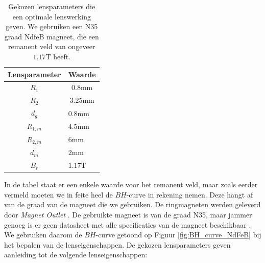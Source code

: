 \documentclass[we,twoside,openright,a4paper,11pt]{uantwerpenbamathesis}
\begin{document}
\begin{table}[H]
\centering
\begin{tabular}{@{}cl@{}}
\toprule
Lensparameter                     & \multicolumn{1}{c}{Waarde}  \\ \midrule
\multicolumn{1}{|c|}{$R_1$}        & \multicolumn{1}{c|}{$0.8\mathrm{mm}$}  \\ \midrule
\multicolumn{1}{|c|}{$R_2$}        & \multicolumn{1}{c|}{$3.25\mathrm{mm}$} \\ \midrule
\multicolumn{1}{|c|}{$d_g$}        & \multicolumn{1}{l|}{$0.8\mathrm{mm}$}  \\ \midrule
\multicolumn{1}{|c|}{$R_{1, m}$} & \multicolumn{1}{l|}{$4.5\mathrm{mm}$}  \\ \midrule
\multicolumn{1}{|c|}{$R_{2, m}$} & \multicolumn{1}{l|}{$6\mathrm{mm}$}    \\ \midrule
\multicolumn{1}{|c|}{$d_m$}        & \multicolumn{1}{l|}{$2\mathrm{mm}$}    \\ \midrule
\multicolumn{1}{|c|}{$B_r$}        & \multicolumn{1}{l|}{$1.17\mathrm{T}$} \\ \midrule
\end{tabular}
\caption{Gekozen lensparameters die een optimale lenswerking geven. We gebruiken een N35 graad NdfeB magneet, die een remanent veld van ongeveer $1.17\mathrm{T}$ heeft.}\label{tab:lens_parameters}
\end{table}
In de tabel staat er een enkele waarde voor het remanent veld, maar zoals eerder vermeld moeten we in feite heel de $BH$-curve in rekening nemen. Deze hangt af van de graad van de magneet die we gebruiken. De ringmagneten werden geleverd door \textit{Magnet Outlet} \cite{Magnet_Outlet}. De gebruikte magneet is van de graad N35, maar jammer genoeg is er geen datasheet met alle specificaties van de magneet beschikbaar \cite{Magnet_Grade}. We gebruiken daarom de $BH$-curve getoond op Figuur \ref{fig:BH_curve_NdFeB} bij het bepalen van de lenseigenschappen. De gekozen lensparameters geven aanleiding tot de volgende lenseigenschappen:
\end{document}

